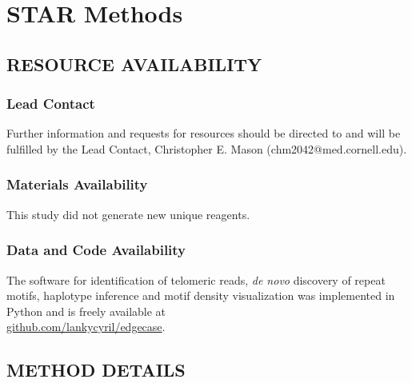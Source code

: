 \documentclass{article}
\begin{document}
\section*{STAR Methods}  \label{sec:methods}

\subsection*{RESOURCE AVAILABILITY} 

\subsubsection*{Lead Contact} 
Further information and requests for resources should be directed to and will be fulfilled by the Lead Contact, Christopher E. Mason (chm2042@med.cornell.edu).
\subsubsection*{Materials Availability} 
This study did not generate new unique reagents.
\subsubsection*{Data and Code Availability} 
The software for identification of telomeric reads, \textit{de novo} discovery of repeat motifs, haplotype inference and motif density visualization was implemented in Python and is freely available at \\%
\href{https://github.com/lankycyril/edgecase}{github.com/lankycyril/edgecase}.

\subsection*{METHOD DETAILS} 
\end{document}
